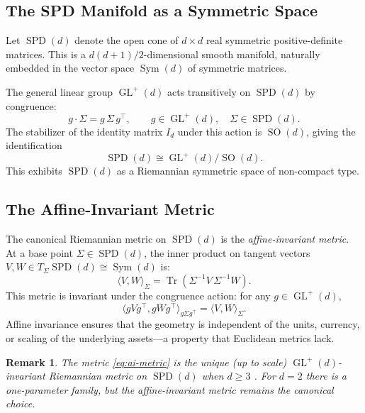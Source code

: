 \documentclass[12pt,a4paper]{article}
\newtheorem{remark}[theorem]{Remark}
\DeclareMathOperator{\Tr}{Tr}
\DeclareMathOperator{\sym}{Sym}
\DeclareMathOperator{\GL}{GL}
\DeclareMathOperator{\SO}{SO}
\DeclareMathOperator{\SPD}{SPD}
\begin{document}
\subsection{The SPD Manifold as a Symmetric Space}

Let $\SPD(d)$ denote the open cone of $d \times d$ real symmetric
positive-definite matrices. This is a $d(d+1)/2$-dimensional smooth manifold,
naturally embedded in the vector space $\sym(d)$ of symmetric matrices.

The general linear group $\GL^+(d)$ acts transitively on $\SPD(d)$ by
congruence:
\begin{equation}
    g \cdot \Sigma = g \, \Sigma \, g^\top, \qquad g \in \GL^+(d), \quad
    \Sigma \in \SPD(d).
\end{equation}
The stabilizer of the identity matrix $I_d$ under this action is $\SO(d)$,
giving the identification
\begin{equation}\label{eq:symmetric-space}
    \SPD(d) \cong \GL^+(d) / \SO(d).
\end{equation}
This exhibits $\SPD(d)$ as a Riemannian symmetric space of non-compact type.

\subsection{The Affine-Invariant Metric}

The canonical Riemannian metric on $\SPD(d)$ is the \emph{affine-invariant
metric}. At a base point $\Sigma \in \SPD(d)$, the inner product on tangent
vectors $V, W \in T_\Sigma \SPD(d) \cong \sym(d)$ is:
\begin{equation}\label{eq:ai-metric}
    \langle V, W \rangle_\Sigma = \Tr\!\left( \Sigma^{-1} V \, \Sigma^{-1} W
    \right).
\end{equation}
This metric is invariant under the congruence action: for any $g \in \GL^+(d)$,
\begin{equation}
    \langle g V g^\top, g W g^\top \rangle_{g \Sigma g^\top}
    = \langle V, W \rangle_\Sigma.
\end{equation}
Affine invariance ensures that the geometry is independent of the units,
currency, or scaling of the underlying assets---a property that Euclidean
metrics lack.

\begin{remark}
The metric \eqref{eq:ai-metric} is the unique (up to scale) $\GL^+(d)$-invariant
Riemannian metric on $\SPD(d)$ when $d \geq 3$ \citep{Bhatia2019}. For $d = 2$
there is a one-parameter family, but the affine-invariant metric remains the
canonical choice.
\end{remark}
\end{document}
